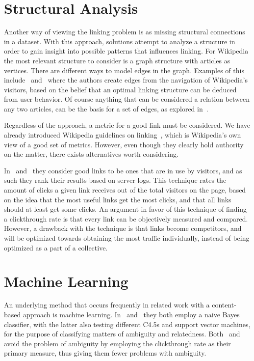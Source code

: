 \section{Structural Analysis}\label{related_structural_analysis}

Another way of viewing the linking problem is as missing structural connections in a dataset. With this approach, solutions attempt to analyze a structure in order to gain insight into possible patterns that influences linking. For Wikipedia the most relevant structure to consider is a graph structure with articles as vertices. There are different ways to model edges in the graph. Examples of this include~\cite{hyperlink-structure-using-logs} and~\cite{west2015mining} where the authors create edges from the navigation of Wikipedia's visitors, based on the belief that an optimal linking structure can be deduced from user behavior. Of course anything that can be considered a relation between any two articles, can be the basis for a set of edges, as explored in~\cite{lu2011link}.

Regardless of the approach, a metric for a good link must be considered. We have already introduced Wikipedia guidelines on linking~\cite{wiki-editor-guidelines}, which is Wikipedia's own view of a good set of metrics. However, even though they clearly hold authority on the matter, there exists alternatives worth considering.

In~\cite{hyperlink-structure-using-logs} and~\cite{west2015mining} they consider good links to be ones that are in use by visitors, and as such they rank their results based on server logs. This technique rates the amount of clicks a given link receives out of the total visitors on the page, based on the idea that the most useful links get the most clicks, and that all links should at least get some clicks. An argument in favor of this technique of finding a clickthrough rate is that every link can be objectively measured and compared. However, a drawback with the technique is that links become competitors, and will be optimized towards obtaining the most traffic individually, instead of being optimized as a part of a collective. 

\section{Machine Learning}\label{related_machine_learning}

An underlying method that occurs frequently in related work with a content-based approach is machine learning. In~\cite{mihalcea2007wikify} and~\cite{milne2008learning} they both employ a naive Bayes classifier, with the latter also testing different C4.5s and support vector machines, for the purpose of classifying matters of ambiguity and relatedness. Both~\cite{hyperlink-structure-using-logs} and~\cite{west2015mining} avoid the problem of ambiguity by employing the clickthrough rate as their primary measure, thus giving them fewer problems with ambiguity.

